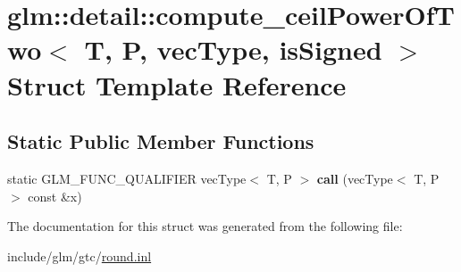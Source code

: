 \hypertarget{structglm_1_1detail_1_1compute__ceilPowerOfTwo}{}\section{glm\+:\+:detail\+:\+:compute\+\_\+ceil\+Power\+Of\+Two$<$ T, P, vec\+Type, is\+Signed $>$ Struct Template Reference}
\label{structglm_1_1detail_1_1compute__ceilPowerOfTwo}
\subsection*{Static Public Member Functions}
\begin{DoxyCompactItemize}
\item 
\mbox{\label{structglm_1_1detail_1_1compute__ceilPowerOfTwo_a81872e12467950a992a4d10c6d73bc45}} 
static G\+L\+M\+\_\+\+F\+U\+N\+C\+\_\+\+Q\+U\+A\+L\+I\+F\+I\+ER vec\+Type$<$ T, P $>$ {\bfseries call} (vec\+Type$<$ T, P $>$ const \&x)
\end{DoxyCompactItemize}


The documentation for this struct was generated from the following file\+:\begin{DoxyCompactItemize}
\item 
include/glm/gtc/\hyperlink{round_8inl}{round.\+inl}\end{DoxyCompactItemize}
